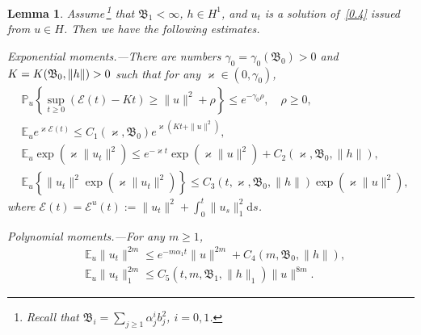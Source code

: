\documentclass[10pt]{amsart}
\newtheorem{lemm}[theo]{Lemma}\newtheorem{prop}[theo]{Proposition}\newtheorem{coro}[theo]{Corollary}\newtheorem{conj}[theo]{Conjecture}
\theoremstyle{definition}\newtheorem{defi}[theo]{Definition}\newtheorem{rema}[theo]{Remark}\newtheorem{exam}[theo]{Example}\newtheorem{exem}[theo]{Example}\newtheorem{nota}[theo]{Notation}
\newcommand{\pP}{{\mathbb P}}
\newcommand{\E}{{\mathbb E}}
\newcommand{\EE}{{\mathcal E}}
\newcommand{\ty}{\infty}
\newcommand{\BBBB}{{\mathfrak B}}
\newcommand{\dd}{\mathrm{d}}
\providecommand{\pointir}{.\enspace---\enspace}
\begin{document}
\begin{lemm}\label{L:5.1}
Assume\,\footnote{Recall that $\BBBB_{i}=\sum_{j\ge1}\alpha_j^i b_j^2$, $i=0,1$.} that $\BBBB_{1}< \ty$, $h\in H^1$, and $u_t$ is a solution of~\eqref{0.4} issued from $u\in H$. Then we have the following estimates.

Exponential moments\pointir There are numbers $\gamma_0=\gamma_0(\BBBB_{0})>0$ and $K=\linebreak K(\BBBB_{0},\|h\|)>0$ such that for any $\varkappa\in(0,\gamma_0)$,
\begin{align}
& \pP_u\left\{\sup_{t\ge0} \left(\EE(t) -Kt\right)\ge \|u\|^2+\rho
\right\} \le e^{-\gamma_0\rho}, \quad \rho\ge0,\label{5.6}
\\
&\E_u e^{\varkappa \EE(t)} \le C_1(\varkappa, \BBBB_0) {e^{\varkappa(Kt+\|u\|^2)}},\label{5.1}
\\
&\E_u \exp(\varkappa \|u_t\|^2)\le e^{-\varkappa t} \exp(\varkappa \|u\|^2)+C_2(\varkappa, \BBBB_{0},\|h\|),\label{5.2}
\\
&\E_u \left\{\|u_t\|^2\exp(\varkappa \|u_t\|^2)\right\}\le C_3(t,\varkappa, \BBBB_{0},\|h\|) \exp(\varkappa \|u\|^2),\label{5.4}
\end{align}
where $\EE(t)=\EE^u(t):= \|u_t\|^2+\int_0^t \|u_s\|_{1}^2\dd s$.

Polynomial moments\pointir For any $m\ge1$,
\begin{align}
&\E_u \|u_t\|^{2m}\le e^{-m\alpha_1 t} \|u\|^{2m}+C_4(m, \BBBB_{0}, \|h\|),\label{5.3}
\\
&\E_u \|u_t\|_1^{2m}\le C_5(t,m, \BBBB_{1},\|h\|_1) \|u\|^{8m}.\label{5.5}
\end{align}
\end{lemm}
\end{document}
